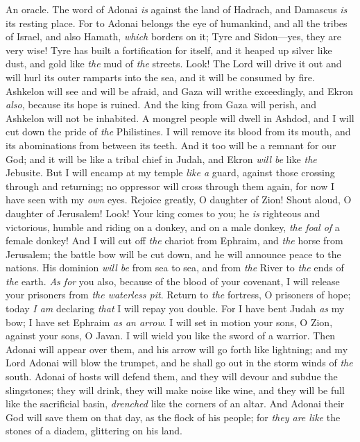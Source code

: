 \begin{biblechapter} %
\verse An oracle. The word of Adonai \textit{is} against the land of Hadrach,
\verse and Damascus \textit{is} its resting place. 
For to Adonai belongs the eye of humankind, 
and all the tribes of Israel,
\verse and also Hamath, \textit{which} borders on it; 
Tyre and Sidon—yes, they are very wise!
\verse Tyre has built a fortification for itself, 
and it heaped up silver like dust, 
and gold like \textit{the} mud of \textit{the} streets.
\verse Look! The Lord will drive it out 
and will hurl its outer ramparts into the sea, 
and it will be consumed by fire.
\verse Ashkelon will see and will be afraid, 
and Gaza will writhe exceedingly, 
and Ekron \textit{also}, because its hope is ruined. 
And the king from Gaza will perish, 
and Ashkelon will not be inhabited.
\verse A mongrel people will dwell in Ashdod, 
and I will cut down the pride of \textit{the} Philistines.
\verse I will remove its blood from its mouth, 
and its abominations from between its teeth. 
And it too will be a remnant for our God; 
and it will be like a tribal chief in Judah, 
and Ekron \textit{will be} like \textit{the} Jebusite.
\verse But I will encamp at my temple \textit{like a} guard, 
against those crossing through and returning; 
no oppressor will cross through them again, 
for now I have seen with my \textit{own} eyes.
\verse Rejoice greatly, O daughter of Zion! 
Shout aloud, O daughter of Jerusalem! 
Look! Your king comes to you; 
he \textit{is} righteous and victorious, 
humble and riding on a donkey, 
and on a male donkey, \textit{the foal of} a female donkey!
\verse And I will cut off \textit{the} chariot from Ephraim, 
and \textit{the} horse from Jerusalem; 
the battle bow will be cut down, 
and he will announce peace to the nations. 
His dominion \textit{will be} from sea to sea, 
and from \textit{the} River to \textit{the} ends of \textit{the} earth.
\verse \textit{As for} you also, because of the blood of your covenant, 
I will release your prisoners from \textit{the waterless pit}.
\verse Return to \textit{the} fortress, 
O prisoners of hope; 
today \textit{I am} declaring \textit{that} I will repay you double.
\verse For I have bent Judah \textit{as} my bow; 
I have set Ephraim \textit{as an arrow}. 
I will set in motion your sons, O Zion, 
against your sons, O Javan. 
I will wield you like the sword of a warrior.
\verse Then Adonai will appear over them, 
and his arrow will go forth like lightning; 
and my Lord Adonai will blow the trumpet, 
and he shall go out in the storm winds of \textit{the} south.
\verse Adonai of hosts will defend them, 
and they will devour and subdue the slingstones; 
they will drink, they will make noise like wine, 
and they will be full like the sacrificial basin, 
\textit{drenched} like the corners of an altar.
\verse And Adonai their God will save them on that day, 
as the flock of his people; 
for \textit{they are like} the stones of a diadem, 
glittering on his land.
\end{biblechapter}

